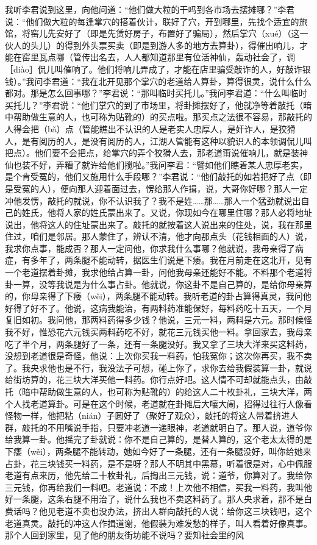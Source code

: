 \documentclass[12pt,UTF8]{ctexbook}
\begin{document}
我听李君说到这里，向他问道：“他们做大粒的干吗到各市场去摆摊哪？”李君说：“他们做大粒的每逢掌穴的搭着伙计，联好了穴，开到哪里，先找个适宜的旅馆，将窑儿先安好了（即是先赁好房子，布置好了骗局），然后掌穴（xué）（这一伙人的头儿）的得到外头票买卖（即是到游人多的地方去算卦），得催出响儿，才能在窑里瓦点哪（管传出名去，人人都知道那里有位活神仙，轰动社会了，调［diào］侃儿叫催响了。他们将响儿弄成了，才能在店里骗受敲诈的人，好敲诈银钱）。”我问李君道：“我在北开见那个掌穴的老道给人算卦，算得很灵，说什么什么都对。那是怎么回事哪？”李君说：“那叫临时买托儿。”我问李君道：“什么叫临时买托儿？”李君说：“他们掌穴的到了市场里，将卦摊摆好了，他就净等着敲托（暗中帮助做生意的人，也可称为贴靴的）的买点啦。那买点之法很不容易，那敲托的人得会把（bǎ）点（管能瞧出不认识的人是老实人忠厚人，是奸诈人，是狡猾人，是有阅历的人，是没有阅历的人，江湖人管能有这种以貌识人的本领调侃儿叫把点）。他们要不会把点，给掌穴的弄个狡猾人去，那老道甭说催响儿，就是装神仙也装不好，弄糟了就许给他们搅啦。”我问李君：“譬如他们瞧着某人忠厚老实，是个肯受冤的，他们又施用什么手段哪？”李君说：“他们敲托的如若把好了点（即是受冤的人），便向那人迎着面过去，愣给那人作揖，说，大哥你好哪？那人一定冲他发愣，敲托的就说，你不认识我了？我不是姓……那……那人一个猛劲就说出自己的姓氏，他将人家的姓氏蒙出来了。又说，你现如今在哪里住哪？那人必将地址说出，他将这人的住址蒙出来了。敲托的就按着这人说出来的住处，说，我在那里住过，咱们是邻居。那人蒙住了，辨认不清，他才向那点头（花钱相面的人）说，我求你点事，能成否？那人一定问他，你求我什么事哪？他就说，我母亲得了病症，有多年了，两条腿不能动转，据医生们说是下痿。我在月前走在这北开，见有一个老道摆着卦摊，我求他给占算一卦，问他我母亲还能好不能。不料那个老道将卦一算，没等我说是为什么事占卦。他就说，你这卦不是自己算的，是给你母亲算的，你母亲得了下痿（wěi），两条腿不能动转。我听老道的卦占算得真灵，我问他好得了好不了。他说，这病我能治，有两料药准能保好，每料药吃十五天，一个月复旧如初。我问他，那两料药得多少钱？他说，三元一料，两料是六元。那时候怪我不好，惟恐花六元钱买两料药吃不好，就花三元钱买他一料。拿回家去，我母亲吃了半个月，两条腿好了一条，还有一条腿没好。我又拿了三块大洋来买这料药，没想到老道很是奇怪，他说：上次你买我一料药，怕我冤你；这次你再买，我不卖了。我央求他也是不行，我没法子可想，碰上你了，求你去给我假装算一卦，就说给街坊算的，花三块大洋买他一料药。你行点好吧。这人情不可却就能点头，由敲托（暗中帮助做生意的人，也可称为贴靴的）的给这人二十枚卦礼，三块大洋，两个人找老道算卦。可是在这个时候，老道就在卦摊后大嚷大闹，招得过往行人像看怪物一样，他把粘（nián）子圆好了（聚好了观众），敲托的将这人带着挤进人群，敲托的不用嘴说手指，只要冲老道一递眼神，老道就明白了。那人说，道爷你给我算一卦。他摇完了卦就说：你不是自己算的，是替人算的，这个老太太得的是下痿（wěi），两条腿不能转动，她如今好了一条腿，还有一条腿没好，叫你给她来占卦，花三块钱买一料药，是不是呀？那人不明其中黑幕，听着很是对，心中佩服老道有点来历，他先给二十枚卦礼，后掏出三元钱，说：道爷，你算对了。我给你三元钱，你再给我们一料吧。老道说：不成！上次他不相信，买我一料药，我叫他好一条腿，这条右腿不用治了，说什么我也不卖这料药了。那人央求着，那不是白费话吗？他见老道不卖也没办法，挤出人群向敲托的人说：给你这三块钱吧，这个老道真灵。敲托的冲这人作揖道谢，他假装为难发愁的样子，叫人看着好像真事。那个人回到家里，见了他的朋友街坊能不说吗？要知社会里的风
\end{document}
